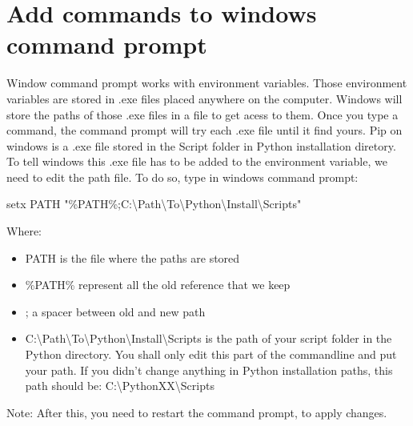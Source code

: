 \documentclass[10pt,letterpaper]{article}
\begin{document}
\section {Add commands to windows command prompt}
Window command prompt works with environment variables. Those environment variables are stored in .exe files placed anywhere on the computer. Windows will store the paths of those .exe files in a file to get acess to them. Once you type a command, the command prompt will try each .exe file until it find yours. Pip on windows is a .exe file stored in the Script folder in Python installation diretory. To tell windows this .exe file has to be added to the environment variable, we need to edit the path file.
To do so, type in windows command prompt:
\begin{mdframed}[backgroundcolor=black, fontcolor=white]
setx PATH "\%PATH\%;C:\textbackslash Path\textbackslash To\textbackslash Python\textbackslash Install\textbackslash Scripts"
\end{mdframed}
Where:
\begin{itemize}
\item PATH is the file where the paths are stored
\item \%PATH\% represent all the old reference that we keep
\item ; a spacer between old and new path
\item C:\textbackslash Path\textbackslash To\textbackslash Python\textbackslash Install\textbackslash Scripts is the path of your script folder in the Python directory. You shall only edit this part of the commandline and put your path. If you didn't change anything in Python installation paths, this path should be: C:\textbackslash PythonXX\textbackslash Scripts
\end{itemize}
\begin{itshape}
Note: After this, you need to restart the command prompt, to apply changes.
\end{itshape}
\newpage
\end{document}
